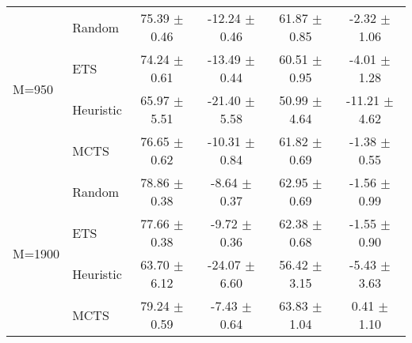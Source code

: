 \begin{tabular}{llcccc}
\midrule
\multirow{4}{*}{M=950}  & Random          & 75.39 $\pm$ 0.46       & -12.24 $\pm$ 0.46       & 61.87 $\pm$ 0.85         & -2.32 $\pm$ 1.06         \\
                        & ETS             & 74.24 $\pm$ 0.61       & -13.49 $\pm$ 0.44       & 60.51 $\pm$ 0.95         & -4.01 $\pm$ 1.28         \\
                        & Heuristic         & 65.97 $\pm$ 5.51       & -21.40 $\pm$ 5.58       & 50.99 $\pm$ 4.64         & -11.21 $\pm$ 4.62        \\
                        & MCTS            & 76.65 $\pm$ 0.62       & -10.31 $\pm$ 0.84       & 61.82 $\pm$ 0.69         & -1.38 $\pm$ 0.55         \\
\midrule
\multirow{4}{*}{M=1900} & Random          & 78.86 $\pm$ 0.38       & -8.64 $\pm$ 0.37        & 62.95 $\pm$ 0.69         & -1.56 $\pm$ 0.99         \\
                        & ETS             & 77.66 $\pm$ 0.38       & -9.72 $\pm$ 0.36        & 62.38 $\pm$ 0.68         & -1.55 $\pm$ 0.90         \\
                        & Heuristic         & 63.70 $\pm$ 6.12       & -24.07 $\pm$ 6.60       & 56.42 $\pm$ 3.15         & -5.43 $\pm$ 3.63         \\
                        & MCTS            & 79.24 $\pm$ 0.59       & -7.43 $\pm$ 0.64        & 63.83 $\pm$ 1.04         & 0.41 $\pm$ 1.10   \\
\bottomrule
\end{tabular}